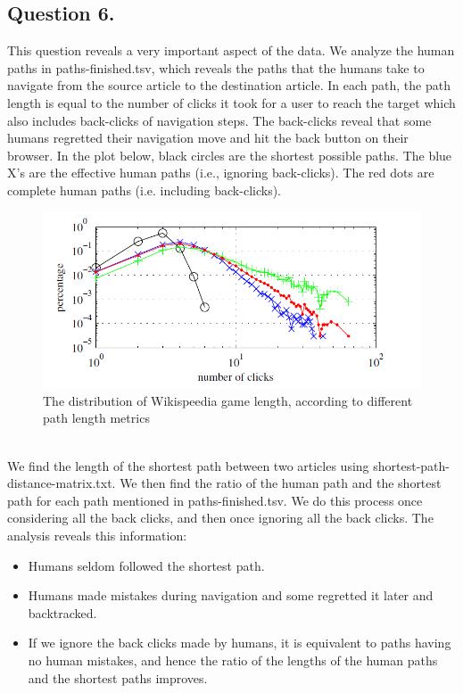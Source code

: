 \documentclass{article}
\begin{document}
\subsection{Question 6.}
This question reveals a very important aspect of the data. We analyze the human paths in paths-finished.tsv, which reveals the paths that the humans take to navigate from the source article to the destination article. In each path, the  path length is equal to the number of clicks it took for
a user to reach the target which also includes back-clicks of navigation steps. The back-clicks reveal that some humans regretted their navigation move and hit the back button on their browser. In the plot below, black circles are the shortest possible paths. The blue X’s are the effective human paths (i.e., ignoring
back-clicks). The red dots are complete human paths (i.e. including back-clicks).\\
\begin{figure}[htbp]
\centerline{\includegraphics{number of clicks.png}}
\caption{The distribution of Wikispeedia game length, according to different path length metrics }
\label{fig}
\end{figure} \\
We find the length of the shortest path between two articles using shortest-path-distance-matrix.txt. We then find the ratio of the human path and the shortest path for each path mentioned in paths-finished.tsv. We do this process once considering all the back clicks, and then once ignoring all the back clicks. The analysis reveals this information:
\begin{itemize}
\item Humans seldom followed the shortest path.
\item Humans made mistakes during navigation and some regretted it later and backtracked.
\item If we ignore the back clicks made by humans, it is equivalent to paths having no human mistakes, and hence the ratio of the lengths of the human paths and the shortest paths improves.
\end{itemize}
\end{document}
